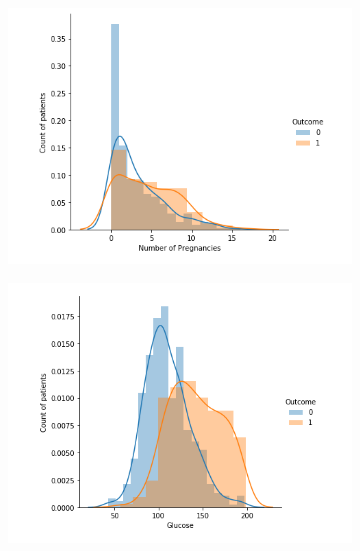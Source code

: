 \documentclass[12pt]{article}
\begin{document}
\begin{figure}
\centering
\begin{subfigure}{0.6\textwidth}
  \centering
  \includegraphics[width=1\linewidth]{preg.PNG}
  \label{fig:sub1}
\end{subfigure}%
\begin{subfigure}{.6\textwidth}
  \centering
  \includegraphics[width=1\linewidth]{glucose.PNG}
  \label{fig:sub2}
\end{subfigure}
\label{fig:test}
\end{figure}
\end{document}
